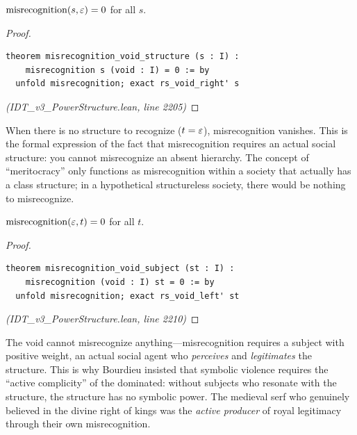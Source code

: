 \begin{theorem}
\label{thm:misrecognition-void}
$\mathrm{misrecognition}(s, \varepsilon) = 0$ for all $s$.
\end{theorem}

\begin{proof}
\begin{lstlisting}
theorem misrecognition_void_structure (s : I) :
    misrecognition s (void : I) = 0 := by
  unfold misrecognition; exact rs_void_right' s
\end{lstlisting}
\textit{(IDT\_v3\_PowerStructure.lean, line 2205)}
\end{proof}

\begin{interpretation}
When there is no structure to recognize ($t = \varepsilon$), misrecognition vanishes.
This is the formal expression of the fact that misrecognition requires an
actual social structure: you cannot misrecognize an absent hierarchy. The
concept of ``meritocracy'' only functions as misrecognition within a
society that actually has a class structure; in a hypothetical structureless
society, there would be nothing to misrecognize.
\end{interpretation}

\begin{theorem}
\label{thm:misrecognition-void-subject}
$\mathrm{misrecognition}(\varepsilon, t) = 0$ for all $t$.
\end{theorem}

\begin{proof}
\begin{lstlisting}
theorem misrecognition_void_subject (st : I) :
    misrecognition (void : I) st = 0 := by
  unfold misrecognition; exact rs_void_left' st
\end{lstlisting}
\textit{(IDT\_v3\_PowerStructure.lean, line 2210)}
\end{proof}

\begin{interpretation}
The void cannot misrecognize anything---misrecognition requires a subject with
positive weight, an actual social agent who \emph{perceives} and
\emph{legitimates} the structure. This is why Bourdieu insisted that symbolic
violence requires the ``active complicity'' of the dominated: without subjects
who resonate with the structure, the structure has no symbolic power. The
medieval serf who genuinely believed in the divine right of kings was the
\emph{active producer} of royal legitimacy through their own misrecognition.
\end{interpretation}

